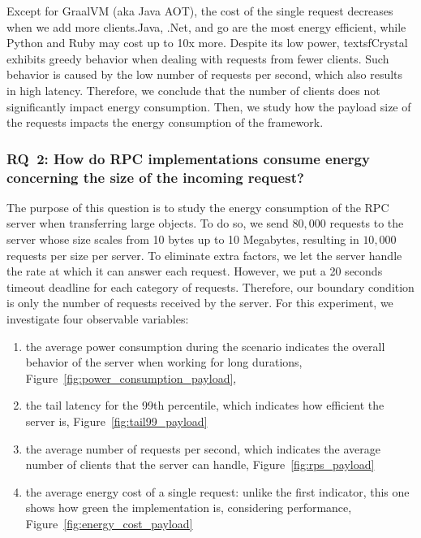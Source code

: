 Except for GraalVM (aka Java AOT), the cost of the single request decreases when we add more clients.Java, .Net, and go are the most energy efficient, while Python and Ruby may cost up to 10x more.
Despite its low power, textsfCrystal exhibits greedy behavior when dealing with requests from fewer clients. Such behavior is caused by the low number of requests per second, which also results in high latency.
Therefore, we conclude that the number of clients does not significantly impact energy consumption.
Then, we study how the payload size of the requests impacts the energy consumption of the framework.




\subsubsection{\textsc{RQ}~2: How do RPC implementations consume energy concerning the size of the incoming request?}

The purpose of this question is to study the energy consumption of the RPC server when transferring large objects.
To do so, we send $80,000$ requests to the server whose size scales from 10 bytes up to 10 Megabytes, resulting in $10,000$ requests per size per server.
To eliminate extra factors, we let the server handle the rate at which it can answer each request.
However, we put a 20 seconds timeout deadline for each category of requests.
Therefore, our boundary condition is only the number of requests received by the server.
For this experiment, we investigate four observable variables:
\begin{enumerate}
    \item the \textsf{average power consumption} during the scenario indicates the overall behavior of the server when working for long durations, Figure~\ref{fig:power_consumption_payload},
    \item the \textsf{tail latency} for the 99th percentile, which indicates how efficient the server is, Figure~\ref{fig:tail99_payload}
    \item the \textsf{average number of requests per second}, which indicates the average number of clients that the server can handle, Figure~\ref{fig:rps_payload}
    \item the \textsf{average energy cost} of a single request: unlike the first indicator, this one shows how green the implementation is, considering performance, Figure~\ref{fig:energy_cost_payload}
\end{enumerate}

